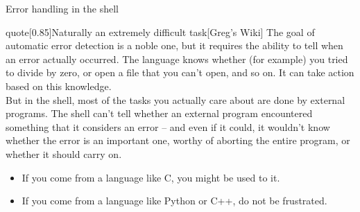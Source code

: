 
\begin{frame}{Error handling in the shell}
    \begin{varblock}{quote}[0.85\textwidth]{Naturally an extremely difficult task}[Greg's Wiki]
        The goal of automatic error detection is a noble one, but it requires the ability to tell when an error actually occurred.
        The language knows whether (for example) you tried to divide by zero, or open a file that you can't open, and so on.
        It can take action based on this knowledge.\\[2mm]
        But in the shell, most of the tasks you actually care about are done by external programs.
        \alert{The shell can't tell whether an external program encountered something that it considers an error} -- and even if it could, it wouldn't know whether the error is an important one, worthy of aborting the entire program, or whether it should carry on.
    \end{varblock}
    \begin{itemize}
        \item If you come from a language like C, you might be used to it.
        \item If you come from a language like Python or C++, do not be frustrated.
    \end{itemize}
\end{frame}
